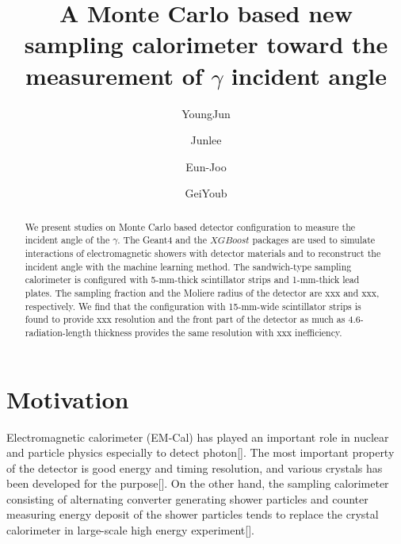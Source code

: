 \documentclass[jkps,preprint,fleqn,showpacs,showkeys]{revtex4}
\newcommand{\XGB}{XGBoost}
\begin{document}
\setcounter{page}{0}
\title[]{ A Monte Carlo based new sampling calorimeter toward the measurement of $\gamma$ incident angle }

\author{YoungJun }
\author{Junlee }
\author{Eun-Joo }
\author{GeiYoub  }


\begin{abstract}
We present studies on Monte Carlo based detector configuration to measure the incident angle of the $\gamma$. The Geant4 and the $\XGB$ packages are used to simulate interactions of electromagnetic showers with detector materials and to reconstruct the incident angle with the machine learning method. The sandwich-type sampling calorimeter is configured with 5-mm-thick scintillator strips and 1-mm-thick lead plates. The sampling fraction and the Moliere radius of the detector are xxx and xxx, respectively. We find that the configuration with 15-mm-wide scintillator strips is found to provide xxx resolution and the front part of the detector as much as 4.6-radiation-length thickness provides the same resolution with xxx inefficiency.
\end{abstract}


\maketitle

\section{Motivation}
\label{sec:mot}
Electromagnetic calorimeter (EM-Cal) has played an important role in nuclear and particle physics especially to detect photon[]. The most important property of the detector is good energy and timing resolution, and various crystals has been developed for the purpose[]. On the other hand, the sampling calorimeter consisting of alternating converter generating shower particles and counter measuring energy deposit of the shower particles tends to replace the crystal calorimeter in large-scale high energy experiment[].
\end{document}
